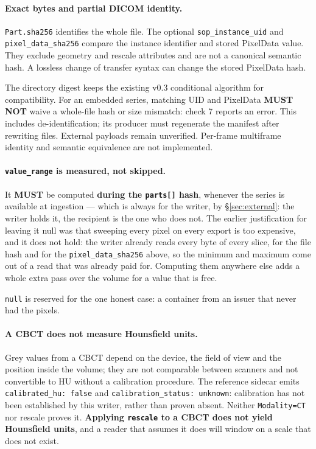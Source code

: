 \documentclass[11pt,a4paper]{article}
\newcommand{\MUST}{\textcolor{uosred}{\textbf{MUST}}}
\newcommand{\MUSTNOT}{\textcolor{uosred}{\textbf{MUST NOT}}}
\newcommand{\code}[1]{\texttt{\small #1}}
\begin{document}
\paragraph{Exact bytes and partial DICOM identity.}\label{par:sliceid}
\code{Part.sha256} identifies the whole file. The optional \code{sop\_instance\_uid}
and \code{pixel\_data\_sha256} compare the instance identifier and stored PixelData value.
They exclude geometry and rescale attributes and are not a canonical semantic hash.
A lossless change of transfer syntax can change the stored PixelData hash.

The directory digest keeps the existing v0.3 conditional algorithm for compatibility.
For an embedded series, matching UID and PixelData \MUSTNOT{} waive a whole-file hash
or size mismatch: check 7 reports an error. This includes de-identification; its producer
must regenerate the manifest after rewriting files. External payloads remain unverified.
Per-frame multiframe identity and semantic equivalence are not implemented.

\paragraph{\code{value\_range} is measured, not skipped.}
It \MUST{} be computed \textbf{during the \code{parts[]} hash}, whenever the series is
available at ingestion --- which is always for the writer, by \S\ref{sec:external}: the
writer holds it, the recipient is the one who does not. The earlier justification for
leaving it null was that sweeping every pixel on every export is too expensive, and it does
not hold: the writer already reads every byte of every slice, for the file hash and for the
\code{pixel\_data\_sha256} above, so the minimum and maximum come out of a read that was
already paid for. Computing them anywhere else adds a whole extra pass over the volume for
a value that is free.

\code{null} is reserved for the one honest case: a container from an issuer that never had
the pixels.

\paragraph{A CBCT does not measure Hounsfield units.}
Grey values from a CBCT depend on the device, the field of view and the position inside the
volume; they are not comparable between scanners and not convertible to HU without a
calibration procedure. The reference sidecar emits \code{calibrated\_hu: false}
and \code{calibration\_status: unknown}: calibration has not been established by this
writer, rather than proven absent. Neither \code{Modality=CT} nor rescale proves it. \textbf{Applying \code{rescale} to a CBCT does not yield Hounsfield
units}, and a reader that assumes it does will window on a scale that does not exist.
\end{document}
